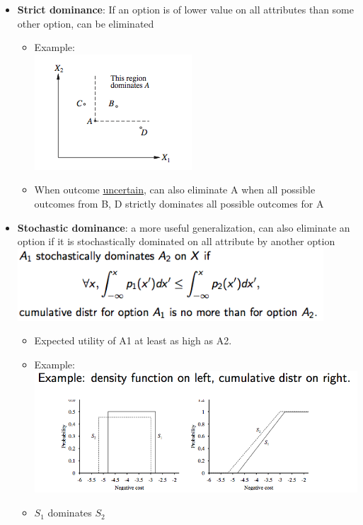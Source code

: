 \documentclass[12pt]{article}
\begin{document}
\begin{tcolorbox}
\begin{itemize}
\item \textbf{Strict dominance}: If an option is of lower value on all attributes than some other option, can be eliminated
\begin{itemize}
\item Example: \\
\includegraphics[scale=0.8]{p17}
\item When outcome \underline{uncertain}, can also eliminate A when all possible outcomes from B, D strictly dominates all possible outcomes for A
\end{itemize}

\item \textbf{Stochastic dominance}: a more useful generalization, can also eliminate an option if it is stochastically dominated on all attribute by another option\\
\includegraphics[width=0.9\textwidth]{p18}
\begin{itemize}
\item Expected utility of A1 at least as high as A2.
\end{itemize}

\begin{itemize}
\item Example: \\
\includegraphics[scale=0.4]{p19}
\item $S_1$ dominates $S_2$
\end{itemize}

\end{itemize}
\end{tcolorbox}
\end{document}
